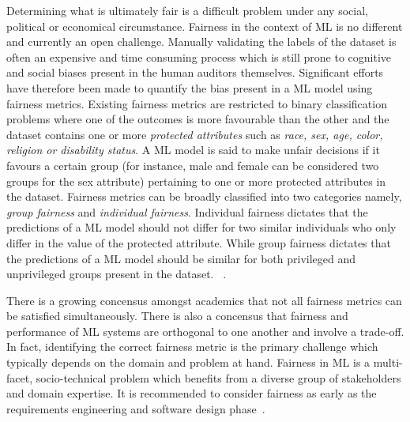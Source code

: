 \documentclass{article}
\begin{document}
Determining what is ultimately fair is a difficult problem under any
social, political or economical circumstance. Fairness in the context
of ML is no different and currently an open challenge. Manually
validating the labels of the dataset is often an expensive and time
consuming process which is still prone to cognitive and social biases
present in the human auditors themselves. Significant efforts have
therefore been made to quantify the bias present in a ML model using
fairness metrics. Existing fairness metrics are restricted to binary
classification problems where one of the outcomes is more favourable
than the other and the dataset contains one or more \emph{protected
attributes} such as \emph{race, sex, age, color, religion or
disability status}. A ML model is said to make unfair decisions if it
favours a certain group (for instance, male and female can be
considered two groups for the sex attribute) pertaining to one or more
protected attributes in the dataset. Fairness metrics can be broadly
classified into two categories namely, \emph{group fairness} and
\emph{individual fairness}. Individual fairness dictates that the
predictions of a ML model should not differ for two similar
individuals who only differ in the value of the protected
attribute. While group fairness dictates that the predictions of a ML
model should be similar for both privileged and unprivileged groups
present in the
dataset.  \cite{castelnovo2022clarification,hellman2020measuring,mitchell2021algorithmic,kusner2017counterfactual,grgic2016case,dwork2012fairness,barocas2019fairness,barocas2016big,hardt2016equality,binns2018fairness,hutchinson201950,verma2018fairness,saxena2019fairness}.

There is a growing concensus amongst academics that not all fairness
metrics can be satisfied simultaneously. There is also a concensus
that fairness and performance of ML systems are orthogonal to one
another and involve a trade-off. In fact, identifying the correct
fairness metric is the primary challenge which typically depends on
the domain and problem at hand. Fairness in ML is a multi-facet,
socio-technical problem which benefits from a diverse group of
stakeholders and domain expertise. It is recommended to consider
fairness as early as the requirements engineering and software design
phase \cite{zhang2020machine,chen2022fairness,mehrabi2021survey,zhang2021ignorance}.
\end{document}
